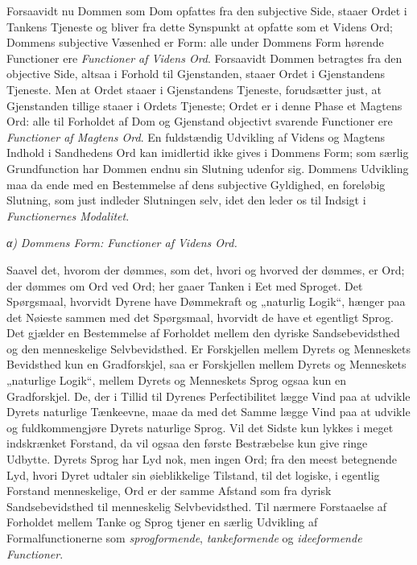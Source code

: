 \documentclass[12pt]{book}
\newcommand{\opage}[1]{\marginnote{\footnotesize\textit{[#1]}}}
\begin{document}
Forsaavidt nu Dommen som Dom opfattes fra den subjective
Side, staaer Ordet i Tankens Tjeneste og bliver fra
dette Synspunkt at opfatte som et Videns Ord; Dommens
subjective Væsenhed er Form: alle under Dommens Form
hørende Functioner ere \emph{Functioner af Videns Ord}.
Forsaavidt Dommen betragtes fra den objective Side, altsaa
i Forhold til Gjenstanden, staaer Ordet i Gjenstandens Tjeneste.
Men at Ordet staaer i Gjenstandens Tjeneste, forudsætter
just, at Gjenstanden tillige staaer i Ordets Tjeneste; Ordet
er i denne Phase et Magtens Ord: alle til Forholdet af
Dom og Gjenstand objectivt svarende Functioner ere \emph{Functioner
af Magtens Ord}. En fuldstændig Udvikling af
Videns og Magtens Indhold i Sandhedens Ord kan imidlertid
ikke gives i Dommens Form; som særlig Grundfunction
har Dommen endnu sin Slutning udenfor sig. Dommens
Udvikling maa da ende med en Bestemmelse af dens subjective
Gyldighed, en foreløbig Slutning, som just indleder
Slutningen selv, idet den leder os til Indsigt i \emph{Functionernes
Modalitet}.

\medskip
\noindent\hspace*{1em}\textit{α)} \emph{Dommens Form: Functioner af Videns Ord.}
\medskip

Saavel det, hvorom der dømmes, som det, hvori og
hvorved der dømmes, er Ord; der dømmes om Ord ved Ord;
her gaaer Tanken i Eet med Sproget. Det Spørgsmaal,
hvorvidt Dyrene have Dømmekraft og „naturlig Logik“, hænger
paa det Nøieste sammen med det Spørgsmaal, hvorvidt de
have et egentligt Sprog. Det gjælder en Bestemmelse af Forholdet
mellem den dyriske Sandsebevidsthed og den menneskelige
Selvbevidsthed. Er Forskjellen mellem Dyrets og
\opage{20}Menneskets Bevidsthed kun en Gradforskjel, saa er Forskjellen
mellem Dyrets og Menneskets „naturlige Logik“, mellem
Dyrets og Menneskets Sprog ogsaa kun en Gradforskjel. De,
der i Tillid til Dyrenes Perfectibilitet lægge Vind paa at
udvikle Dyrets naturlige Tænkeevne, maae da med det Samme
lægge Vind paa at udvikle og fuldkommengjøre Dyrets naturlige
Sprog. Vil det Sidste kun lykkes i meget indskrænket
Forstand, da vil ogsaa den første Bestræbelse kun give ringe Udbytte.
Dyrets Sprog har Lyd nok, men ingen Ord; fra den
meest betegnende Lyd, hvori Dyret udtaler sin øieblikkelige
Tilstand, til det logiske, i egentlig Forstand menneskelige, Ord
er der samme Afstand som fra dyrisk Sandsebevidsthed til
menneskelig Selvbevidsthed. Til nærmere Forstaaelse af Forholdet
mellem Tanke og Sprog tjener en særlig Udvikling
af Formalfunctionerne som \emph{sprogformende}, \emph{tankeformende}
og \emph{ideeformende Functioner}.
\end{document}
